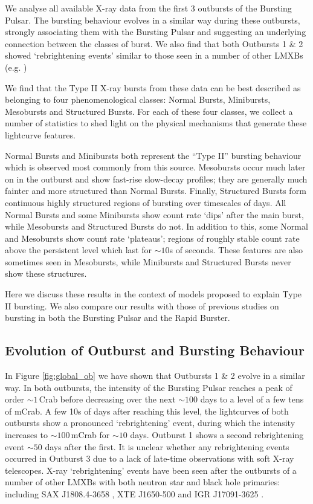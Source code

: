 \par We analyse all available X-ray data from the first 3 outbursts of the Bursting Pulsar.  The bursting behaviour evolves in a similar way during these outbursts, strongly associating them with the Bursting Pulsar and suggesting an underlying connection between the classes of burst.  We also find that both Outbursts 1 \& 2 showed `rebrightening events' similar to those seen in a number of other LMXBs (e.g. \citealp{Wijnands_1808,Patruno_Reflares2})
\par We find that the Type II X-ray bursts from these data can be best described as belonging to four phenomenological classes: Normal Bursts, Minibursts, Mesobursts and Structured Bursts.  For each of these four classes, we collect a number of statistics to shed light on the physical mechanisms that generate these lightcurve features.
\par Normal Bursts and Minibursts both represent the ``Type II'' bursting behaviour which is observed most commonly from this source.   Mesobursts occur much later on in the outburst and show fast-rise slow-decay profiles; they are generally much fainter and more structured than Normal Bursts.  Finally, Structured Bursts form continuous highly structured regions of bursting over timescales of days.  All Normal Bursts and some Minibursts show count rate `dips' after the main burst, while Mesobursts and Structured Bursts do not.  In addition to this, some Normal and Mesobursts show count rate `plateaus'; regions of roughly stable count rate above the persistent level which last for $\sim10$s of seconds.  These features are also sometimes seen in Mesobursts, while Minibursts and Structured Bursts never show these structures.
\par Here we discuss these results in the context of models proposed to explain Type II bursting.  We also compare our results with those of previous studies on bursting in both the Bursting Pulsar and the Rapid Burster.

\subsection{Evolution of Outburst and Bursting Behaviour}

\par In Figure \ref{fig:global_ob} we have shown that Outbursts 1 \& 2 evolve in a similar way.  In both outbursts, the intensity of the Bursting Pulsar reaches a peak of order $\sim1$\,Crab before decreasing over the next $\sim100$ days to a level of a few tens of mCrab.  A few 10s of days after reaching this level, the lightcurves of both outbursts show a pronounced `rebrightening' event, during which the intensity increases to $\sim100$\,mCrab for $\sim10$ days.  Outburst 1 shows a second rebrightening event $\sim50$ days after the first.  It is unclear whether any rebrightening events occurred in Outburst 3 due to a lack of late-time observations with soft X-ray telescopes.  X-ray `rebrightening' events have been seen after the outbursts of a number of other LMXBs with both neutron star and black hole primaries: including SAX J1808.4-3658 \citep{Wijnands_1808}, XTE J1650-500 \citep{Tomsick_MiniOutbursts} and IGR J17091-3625 \citep{Court_IGRClasses}.

